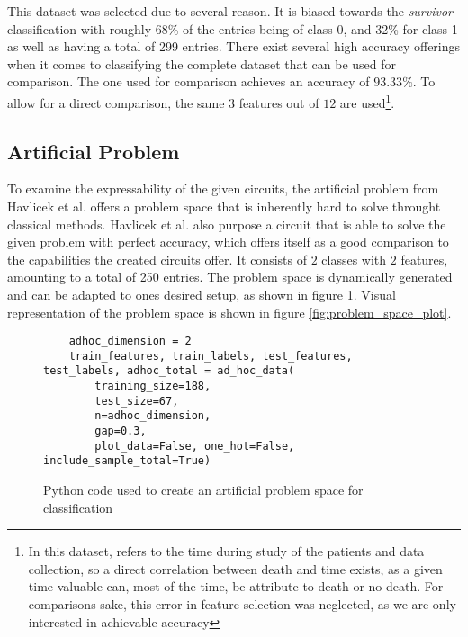 This dataset \cite{ahmad_survival_2017} was selected due to several reason. It is biased towards the \emph{survivor} classification with roughly 68\% of the entries being of class 0, and 32\% for class 1 as well as having a total of 299 entries. There exist several high accuracy offerings when it comes to classifying the complete dataset that can be used for comparison. The one used for comparison\cite{sakhiya_heart_nodate} achieves an accuracy of $93.33\%$. To allow for a direct comparison, the same $3$ features out of $12$ are used\footnote{In this dataset,  refers to the time during study of the patients and data collection, so a direct correlation between death and time exists, as a given time valuable can, most of the time, be attribute to death or no death. For comparisons sake, this error in feature selection was neglected, as we are only interested in achievable accuracy}.

\subsection{Artificial Problem}
\label{chapter:artificial_problem}

To examine the expressability of the given circuits, the artificial problem from Havlicek et al. \cite{havlicek_supervised_2019} offers a problem space that is inherently hard to solve throught classical methods. Havlicek et al. also purpose a circuit that is able to solve the given problem with perfect accuracy, which offers itself as a good comparison to the capabilities the created circuits offer. It consists of $2$ classes with $2$ features, amounting to a total of 250 entries. The problem space is dynamically generated and can be adapted to ones desired setup, as shown in figure \ref{fig:ad_hoc_code}. Visual representation of the problem space is shown in figure \ref{fig:problem_space_plot}.

\begin{figure}[!ht]
    \centering
    \begin{verbatim}
    adhoc_dimension = 2
    train_features, train_labels, test_features, test_labels, adhoc_total = ad_hoc_data(
        training_size=188,
        test_size=67,
        n=adhoc_dimension,
        gap=0.3,
        plot_data=False, one_hot=False, include_sample_total=True)
    \end{verbatim}
    \caption{Python code used to create an artificial problem space for classification}
    \label{fig:ad_hoc_code}
\end{figure}

